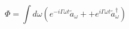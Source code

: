 \begin{equation}
\Phi=\int d\omega  (e^{-i\Gamma \omega t}\tilde
a_\omega +
+e^{i\Gamma \omega t}\tilde a_\omega^\dagger)
\end{equation}

